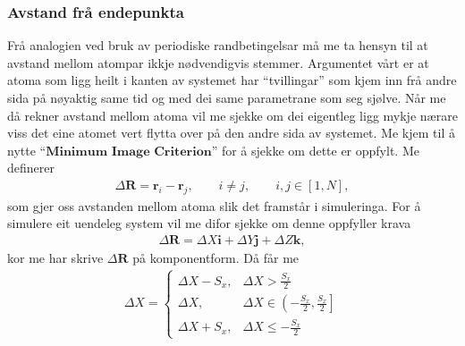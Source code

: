 \documentclass[12pt, a4paper]{article}
\theoremstyle{definition} \newtheorem*{definition}{Teorem}
\newcommand{\vb}{\mathbf}
\begin{document}
        \subsubsection*{Avstand frå endepunkta}
            Frå analogien ved bruk av periodiske randbetingelsar må me ta hensyn til at avstand mellom atompar ikkje nødvendigvis stemmer. Argumentet vårt er at 
            atoma som ligg heilt i kanten av systemet har ``tvillingar'' som kjem inn frå andre sida på nøyaktig same tid og med dei same parametrane som seg sjølve.
            Når me då rekner avstand mellom atoma vil me sjekke om dei eigentleg ligg mykje nærare viss det eine atomet vert flytta over på den andre sida av systemet.
            Me kjem til å nytte ``$\textbf{Minimum Image Criterion}$'' for å sjekke om dette er oppfylt. Me definerer
            \begin{align*}
                \Delta \vb{R} = \vb{r}_i - \vb{r}_j, \qquad i \neq j, \qquad i, j \in [1, N],
            \end{align*}
            som gjer oss avstanden mellom atoma slik det framstår i simuleringa. For å simulere eit uendeleg system vil me difor sjekke om denne oppfyller krava
            \begin{align*}
                \Delta \vb{R} = \Delta X\vb{i} + \Delta Y\vb{j} + \Delta Z\vb{k},
            \end{align*}
            kor me har skrive $\Delta \vb{R}$ på komponentform. Då får me
            \begin{align*}
                \Delta X = 
                \begin{cases}
                    \Delta X - S_x, & \Delta X > \frac{S_x}{2} \\
                    \Delta X, & \Delta X \in \left( -\frac{S_x}{2}, \frac{S_x}{2} \right] \\
                    \Delta X + S_x, & \Delta X \leq -\frac{S_x}{2}
                \end{cases}
            \end{align*}
\end{document}
